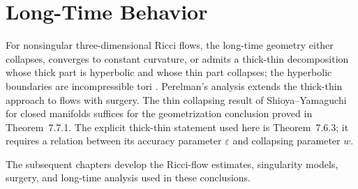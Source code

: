 \section{Long-Time Behavior}

For nonsingular three-dimensional Ricci flows, the long-time geometry
either collapses, converges to constant curvature, or admits a
thick-thin decomposition whose thick part is hyperbolic and whose thin
part collapses; the hyperbolic boundaries are incompressible tori
\cite{Ha99, ScY79, MY, ChG86, ChG90}.  Perelman's analysis extends the
thick-thin approach to flows with surgery.  The thin collapsing result
of Shioya--Yamaguchi for closed manifolds \cite{ShY} suffices for the
geometrization conclusion proved in Theorem~7.7.1.  The explicit
thick-thin statement used here is Theorem~7.6.3; it requires a relation
between its accuracy parameter $\varepsilon$ and collapsing parameter
$w$.

The subsequent chapters develop the Ricci-flow estimates, singularity
models, surgery, and long-time analysis used in these conclusions.
